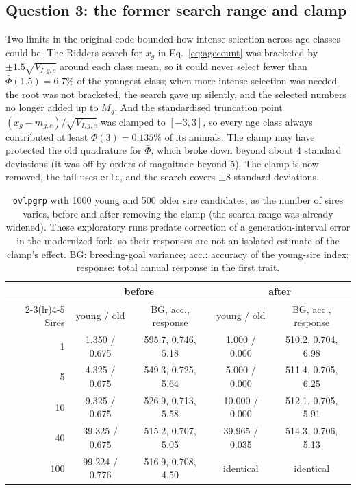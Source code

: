 \documentclass[11pt]{article}
\newcommand{\src}[1]{\texttt{#1}}
\begin{document}
\subsection{Question 3: the former search range and clamp}
Two limits in the original code bounded how intense selection across age classes could be. The Ridders search for $x_g$ in Eq.~\eqref{eq:agecount} was bracketed by $\pm1.5\sqrt{V_{I,g,c}}$ around each class mean, so it could never select fewer than $\bar\Phi(1.5)=6.7\%$ of the youngest class; when more intense selection was needed the root was not bracketed, the search gave up silently, and the selected numbers no longer added up to $M_g$. And the standardised truncation point $(x_g-m_{g,c})/\sqrt{V_{I,g,c}}$ was clamped to $[-3,3]$, so every age class always contributed at least $\bar\Phi(3)=0.135\%$ of its animals. The clamp may have protected the old quadrature for $\bar\Phi$, which broke down beyond about 4 standard deviations (it was off by orders of magnitude beyond 5). The clamp is now removed, the tail uses \src{erfc}, and the search covers $\pm8$ standard deviations.

\begin{table}[ht]
\centering\small
\caption{\src{ovlpgrp} with 1000 young and 500 older sire candidates, as the number of sires varies, before and after removing the clamp (the search range was already widened). These exploratory runs predate correction of a generation-interval error in the modernized fork, so their responses are not an isolated estimate of the clamp's effect. BG: breeding-goal variance; acc.: accuracy of the young-sire index; response: total annual response in the first trait.}\label{tab:clamp}
\begin{tabular}{rcccc}\toprule
& \multicolumn{2}{c}{before} & \multicolumn{2}{c}{after}\\\cmidrule(lr){2-3}\cmidrule(lr){4-5}
Sires & young / old & BG, acc., response & young / old & BG, acc., response\\\midrule
1 & 1.350 / 0.675 & 595.7, 0.746, 5.18 & 1.000 / 0.000 & 510.2, 0.704, 6.98\\
5 & 4.325 / 0.675 & 549.3, 0.725, 5.64 & 5.000 / 0.000 & 511.4, 0.705, 6.25\\
10 & 9.325 / 0.675 & 526.9, 0.713, 5.58 & 10.000 / 0.000 & 512.1, 0.705, 5.91\\
40 & 39.325 / 0.675 & 515.2, 0.707, 5.05 & 39.965 / 0.035 & 514.3, 0.706, 5.13\\
100 & 99.224 / 0.776 & 516.9, 0.708, 4.50 & identical & identical\\\bottomrule
\end{tabular}
\end{table}
\end{document}
